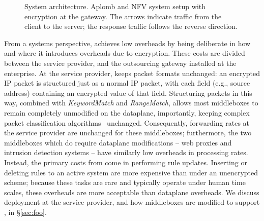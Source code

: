     
 \setcounter{theapp}{0}  
\newcommand{\capp}{\refstepcounter{theapp}\arabic{theapp}}

\begin{figure}[t!]
\centering
{}
%
\hfill  
{}
     
\caption{System architecture. Aplomb and NFV system setup with \sys encryption  at the gateway. The arrows indicate traffic from the client to the server; the response traffic follows the reverse direction. \label{fig:sys-overview}}
\end{figure}


  From a systems perspective, \sys achieves low overheads by being deliberate in how and where it introduces overheads due to encryption. 
  These costs are divided between the service provider, and the outsourcing gateway installed at the enterprise.
  At the service provider, \sys keeps packet formats unchanged: an encrypted IP packet is structured just as a normal IP packet, with each field (e.g., source address) containing an encrypted value of that field. 
  Structuring packets in this way, combined with {\it KeywordMatch} and {\it RangeMatch}, allows most middleboxes to remain completely unmodified on the dataplane, importantly, keeping complex packet classification algorithms~\cite{somethingclassification--chang?} unchanged.
  Consequently, forwarding rates at the service provider are unchanged for these middleboxes; furthermore, the two middleboxes which do require dataplane modifications -- web proxies and intrusion detection systems -- have similarly low overheads in processing rates.
  Instead, the primary costs from \sys come in performing rule updates.
  Inserting or deleting rules to an active system are more expensive than under an unencrypted scheme; because these tasks are rare and typically operate under human time scales, these overheads are more acceptable than dataplane overheads.
  We discuss deployment at the service provider, and how middleboxes are modified to support \sys, in \S\ref{sec:foo}.

